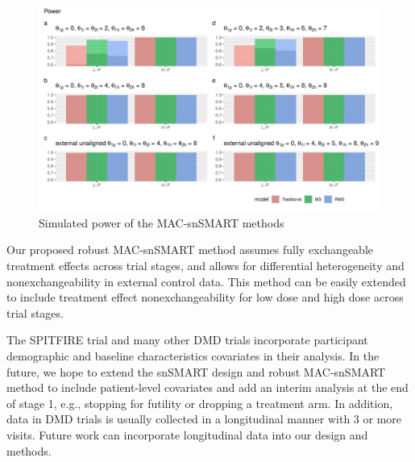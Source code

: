 \begin{figure}[H]
\centerline{\includegraphics[width=16cm]{chapters/figures/CRpower.pdf}}
\caption{Simulated power of the MAC-snSMART methods}
\label{fig:Power}
\end{figure}

Our proposed robust MAC-snSMART method assumes fully exchangeable treatment effects across trial stages, and allows for differential heterogeneity and nonexchangeability in external control data. This method can be easily extended to include treatment effect nonexchangeability for low dose and high dose across trial stages.

The SPITFIRE trial and many other \ac{DMD} trials incorporate participant demographic and baseline characteristics covariates in their analysis. In the future, we hope to extend the \ac{snSMART} design and robust \ac{MAC}-snSMART method to include patient-level covariates and add an interim analysis at the end of stage 1, e.g., stopping for futility or dropping a treatment arm. In addition, data in \ac{DMD} trials is usually collected in a longitudinal manner with 3 or more visits. Future work can incorporate longitudinal data into our design and methods. 